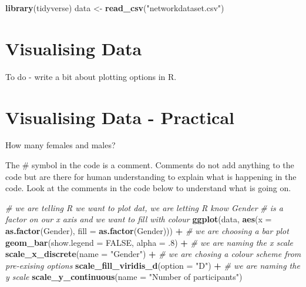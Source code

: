 \documentclass[]{book}
\newenvironment{Shaded}{\begin{snugshade}}{\end{snugshade}}
\newcommand{\KeywordTok}[1]{\textcolor[rgb]{0.13,0.29,0.53}{\textbf{#1}}}
\newcommand{\DataTypeTok}[1]{\textcolor[rgb]{0.13,0.29,0.53}{#1}}
\newcommand{\DecValTok}[1]{\textcolor[rgb]{0.00,0.00,0.81}{#1}}
\newcommand{\StringTok}[1]{\textcolor[rgb]{0.31,0.60,0.02}{#1}}
\newcommand{\CommentTok}[1]{\textcolor[rgb]{0.56,0.35,0.01}{\textit{#1}}}
\newcommand{\OtherTok}[1]{\textcolor[rgb]{0.56,0.35,0.01}{#1}}
\newcommand{\OperatorTok}[1]{\textcolor[rgb]{0.81,0.36,0.00}{\textbf{#1}}}
\newcommand{\NormalTok}[1]{#1}
\begin{document}
\begin{Shaded}
\begin{Highlighting}[]
\KeywordTok{library}\NormalTok{(tidyverse)}
\NormalTok{data <-}\StringTok{ }\KeywordTok{read_csv}\NormalTok{(}\StringTok{"networkdataset.csv"}\NormalTok{)}
\end{Highlighting}
\end{Shaded}

\section{Visualising Data}\label{visualising-data}

To do - write a bit about plotting options in R.

\section{Visualising Data -
Practical}\label{visualising-data---practical}

How many females and males?

The \# symbol in the code is a comment. Comments do not add anything to
the code but are there for human understanding to explain what is
happening in the code. Look at the comments in the code below to
understand what is going on.

\begin{Shaded}
\begin{Highlighting}[]
\CommentTok{# we are telling R we want to plot dat, we are letting R know Gender }
\CommentTok{# is a factor on our x axis and we want to fill with colour}
\KeywordTok{ggplot}\NormalTok{(data, }\KeywordTok{aes}\NormalTok{(}\DataTypeTok{x =} \KeywordTok{as.factor}\NormalTok{(Gender), }\DataTypeTok{fill =} \KeywordTok{as.factor}\NormalTok{(Gender))) }\OperatorTok{+}
\StringTok{  }\CommentTok{# we are choosing a bar plot}
\StringTok{  }\KeywordTok{geom_bar}\NormalTok{(}\DataTypeTok{show.legend =} \OtherTok{FALSE}\NormalTok{, }\DataTypeTok{alpha =}\NormalTok{ .}\DecValTok{8}\NormalTok{) }\OperatorTok{+}
\StringTok{  }\CommentTok{# we are naming the x scale}
\StringTok{  }\KeywordTok{scale_x_discrete}\NormalTok{(}\DataTypeTok{name =} \StringTok{"Gender"}\NormalTok{) }\OperatorTok{+}
\StringTok{  }\CommentTok{# we are chosing a colour scheme from pre-exising options}
\StringTok{  }\KeywordTok{scale_fill_viridis_d}\NormalTok{(}\DataTypeTok{option =} \StringTok{"D"}\NormalTok{) }\OperatorTok{+}
\StringTok{  }\CommentTok{# we are naming the y scale}
\StringTok{  }\KeywordTok{scale_y_continuous}\NormalTok{(}\DataTypeTok{name =} \StringTok{"Number of participants"}\NormalTok{)}
\end{Highlighting}
\end{Shaded}
\end{document}
